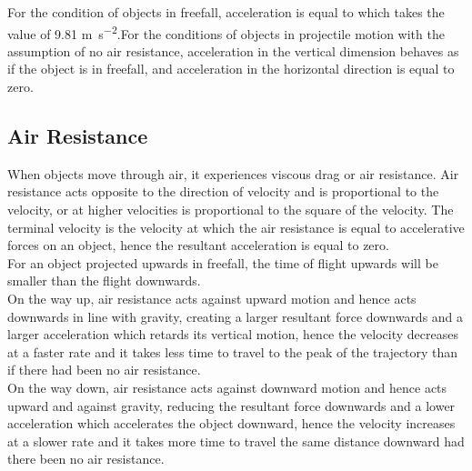 \documentclass[../main]{subfiles}
\begin{document}
	For the condition of objects in freefall, acceleration is equal to which takes the value of 9.81 \si{m.s^{-2}}.For the conditions of objects in projectile motion with the assumption of no air resistance, acceleration in the vertical dimension behaves as if the object is in freefall, and acceleration in the horizontal direction is equal to zero.

	\subsection{Air Resistance}

	When objects move through air, it experiences viscous drag or air resistance. Air resistance acts opposite to the direction of velocity and is proportional to the velocity, or at higher velocities is proportional to the square of the velocity. The terminal velocity is the velocity at which the air resistance is equal to accelerative forces on an object, hence the resultant acceleration is equal to zero. \\

	For an object projected upwards in freefall, the time of flight upwards will be smaller than the flight downwards. \\

	On the way up, air resistance acts against upward motion and hence acts downwards in line with gravity, creating a larger resultant force downwards and a larger acceleration which retards its vertical motion, hence the velocity decreases at a faster rate and it takes less time to travel to the peak of the trajectory than if there had been no air resistance. \\

	On the way down, air resistance acts against downward motion and hence acts upward and against gravity, reducing the resultant force downwards and a lower acceleration which accelerates the object downward, hence the velocity increases at a slower rate and it takes more time to travel the same distance downward had there been no air resistance.
\end{document}
